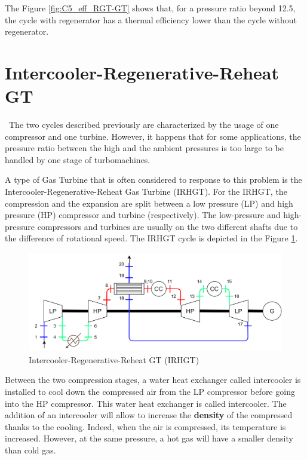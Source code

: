 The Figure \ref{fig:C5_eff_RGT-GT} shows that, for a pressure ratio beyond 12.5, the cycle with regenerator has a thermal efficiency lower than the cycle without regenerator. 

\section{Intercooler-Regenerative-Reheat GT}
\quad\ The two cycles described previously are characterized by the usage of one compressor and one turbine. However, it happens that for some applications, the pressure ratio between the high and the ambient pressures is too large to be handled by one stage of turbomachines.

A type of Gas Turbine that is often considered to response to this problem is the Intercooler-Regenerative-Reheat Gas Turbine (IRHGT). For the IRHGT, the compression and the expansion are split between a low pressure (LP) and high pressure (HP) compressor and turbine (respectively). The low-pressure and high-pressure compressors and turbines are usually on the two different shafts due to the difference of rotational speed. The IRHGT cycle is depicted in the Figure \ref{fig:C5_IRHGT}.

\begin{figure}[h]
\centering
\includegraphics[scale=0.15]{IRHGT}
\caption{Intercooler-Regenerative-Reheat GT (IRHGT)}
\label{fig:C5_IRHGT}
\end{figure}

Between the two compression stages, a water heat exchanger called intercooler is installed to cool down the compressed air from the LP compressor before going into the HP compressor. This water heat exchanger is called intercooler. The addition of an intercooler will allow to increase the \textbf{density} of the compressed thanks to the cooling. Indeed, when the air is compressed, its temperature is increased. However, at the same pressure, a hot gas will have a smaller density than cold gas. 

